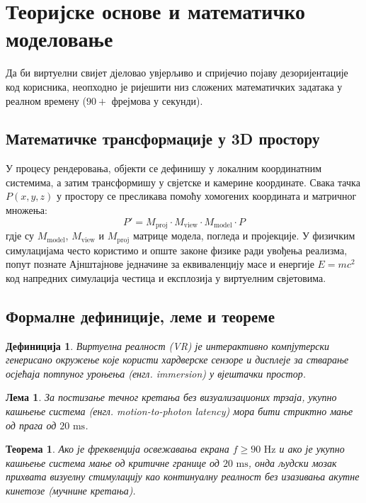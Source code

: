 \documentclass[12pt,a4paper]{article}
\newtheorem{teorema}{Теорема}[section]
\newtheorem{definicija}{Дефиниција}[section]
\newtheorem{lema}{Лема}[section]
\begin{document}
\section{Теоријске основе и математичко моделовање}

Да би виртуелни свијет дјеловао увјерљиво и спријечио појаву дезоријентације код корисника, неопходно је ријешити низ сложених математичких задатака у реалном времену ($90+$ фрејмова у секунди).

\subsection{Математичке трансформације у 3D простору}

У процесу рендеровања, објекти се дефинишу у локалним координатним системима, а затим трансформишу у свјетске и камерине координате. Свака тачка $P(x, y, z)$ у простору се пресликава помоћу хомогених координата и матричног множења:
\begin{equation}
    P' = M_{\text{proj}} \cdot M_{\text{view}} \cdot M_{\text{model}} \cdot P
\end{equation}
гдје су $M_{\text{model}}$, $M_{\text{view}}$ и $M_{\text{proj}}$ матрице модела, погледа и пројекције. У физичким симулацијама често користимо и опште законе физике ради увођења реализма, попут познате Ајнштајнове једначине за еквиваленцију масе и енергије $E = mc^2$ код напредних симулација честица и експлозија у виртуелним свјетовима.

\subsection{Формалне дефиниције, леме и теореме}

\begin{definicija}
Виртуелна реалност (VR) је интерактивно компјутерски генерисано окружење које користи хардверске сензоре и дисплеје за стварање осјећаја потпуног уроњења (енгл. immersion) у вјештачки простор.
\end{definicija}

\begin{lema}
За постизање течног кретања без визуализационих трзаја, укупно кашњење система (енгл. motion-to-photon latency) мора бити стриктно мање од прага од $20 \text{ ms}$.
\end{lema}

\begin{teorema}
Ако је фреквенција освежавања екрана $f \ge 90 \text{ Hz}$ и ако је укупно кашњење система мање од критичне границе од $20 \text{ ms}$, онда људски мозак прихвата визуелну стимулацију као континуалну реалност без изазивања акутне кинетозе (мучнине кретања).
\end{teorema}
\end{document}
